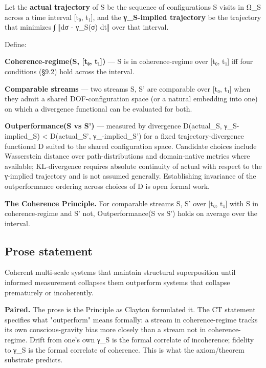 \documentclass[11pt, openany]{book}
\renewenvironment{quote}{\begin{quoting}}{\end{quoting}}
\begin{document}
Let the \textbf{actual trajectory} of S be the sequence of configurations S visits in Ω\_\allowbreak{}S across a time interval [t₀, t₁], and the \textbf{γ\_\allowbreak{}S-implied trajectory} be the trajectory that minimizes ∫ ‖dσ - γ\_\allowbreak{}S(σ) dt‖ over that interval.

Define:

\begin{quote}
\textbf{Coherence-regime(S, [t₀, t₁])} --- S is in coherence-regime over [t₀, t₁] iff four conditions (§9.2) hold across the interval.

\textbf{Comparable streams} --- two streams S, S' are comparable over [t₀, t₁] when they admit a shared DOF-configuration space (or a natural embedding into one) on which a divergence functional can be evaluated for both.

\textbf{Outperformance(S vs S')} --- measured by divergence D(actual\_\allowbreak{}S, γ\_\allowbreak{}S-implied\_\allowbreak{}S) < D(actual\_\allowbreak{}S', γ\_-implied\_\allowbreak{}S') for a fixed trajectory-divergence functional D suited to the shared configuration space. Candidate choices include Wasserstein distance over path-distributions and domain-native metrics where available; KL-divergence requires absolute continuity of actual with respect to the γ-implied trajectory and is not assumed generally. Establishing invariance of the outperformance ordering across choices of D is open formal work.
\end{quote}

\textbf{The Coherence Principle.} For comparable streams S, S' over [t₀, t₁] with S in coherence-regime and S' not, Outperformance(S vs S') holds on average over the interval.

\subsection{Prose statement}

Coherent multi-scale systems that maintain structural superposition until informed measurement collapses them outperform systems that collapse prematurely or incoherently.

\textbf{Paired.} The prose is the Principle as Clayton formulated it. The CT statement specifies what "outperform" means formally: a stream in coherence-regime tracks its own conscious-gravity bias more closely than a stream not in coherence-regime. Drift from one's own γ\_\allowbreak{}S is the formal correlate of incoherence; fidelity to γ\_\allowbreak{}S is the formal correlate of coherence. This is what the axiom/theorem substrate predicts.
\end{document}
